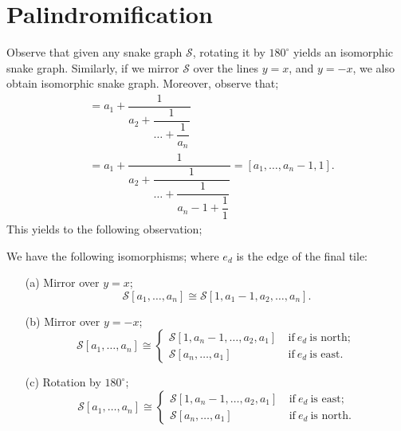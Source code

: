 \section{Palindromification}
Observe that given any snake graph $\mathcal{S}$, rotating it by $180^{\circ}$ yields an isomorphic snake graph. Similarly, if we mirror $\mathcal{S}$ over the lines $y = x$, and $y = -x$, we also obtain isomorphic snake graph. Moreover, observe that;
\begin{align*}
    [a_1,\dots,a_n] &= a_1 + \dfrac{1}{a_2+\dfrac{1}{\dots + \dfrac{1}{a_n}}}\\
    &= a_1 + \dfrac{1}{a_2+\dfrac{1}{\dots + \dfrac{1}{a_n-1 + \dfrac{1}{1} }}}= [a_1,\dots,a_n -1 , 1].
\end{align*}
This yields to the following observation;
\begin{theorem}\label{thm3.8}
    We have the following isomorphisms; where $e_d$ is the edge of the final tile:
\begin{itemize}
    \item[(a)] Mirror over $y=x$;
    \begin{equation*}
        \mathcal{S}[a_1,\dots,a_n] \cong \mathcal{S}[1,a_1-1,a_2,\dots,a_n].
    \end{equation*}
    \item[(b)] Mirror over $y = -x$;
    \begin{equation*}
        \mathcal{S}[a_1,\dots,a_n] \cong 
        \begin{cases}
            \mathcal{S}[1,a_n-1,\dots,a_2,a_1] \ &\text{if} \ e_d \ \text{is north}; \\
            \mathcal{S}[a_n,\dots,a_1] \ &\text{if} \ e_d \ \text{is east.}
        \end{cases}
    \end{equation*}
    \item[(c)] Rotation by $180^{\circ}$;
    \begin{equation*}
        \mathcal{S}[a_1,\dots,a_n] \cong 
        \begin{cases}
            \mathcal{S}[1,a_n-1,\dots,a_2,a_1] \ &\text{if} \ e_d \ \text{is east}; \\
            \mathcal{S}[a_n,\dots,a_1] \ &\text{if} \ e_d \ \text{is north.}
        \end{cases}
    \end{equation*}
\end{itemize}
\end{theorem}
